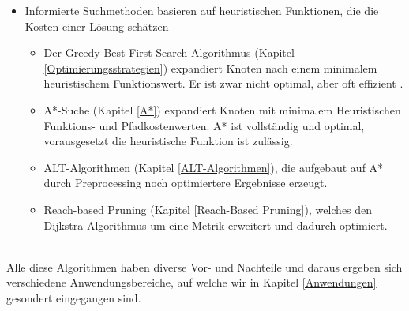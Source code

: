 \begin{itemize}
\begin{itemize}
    \end{itemize}
    \newpage
    \item Informierte Suchmethoden basieren auf heuristischen Funktionen, die die Kosten einer Lösung schätzen
    \begin{itemize}
        \item Der Greedy Best-First-Search-Algorithmus (Kapitel \ref{Optimierungsstrategien}) expandiert Knoten nach einem minimalem heuristischem Funktionswert. Er ist zwar nicht optimal, aber oft effizient \cite[108,109]{Russell:10}.
        \item A*-Suche (Kapitel \ref{A*}) expandiert Knoten mit minimalem Heuristischen Funktions- und Pfadkostenwerten. A* ist vollständig und optimal, vorausgesetzt die heuristische Funktion ist zulässig.
        \item ALT-Algorithmen (Kapitel \ref{ALT-Algorithmen}), die aufgebaut auf A* durch Preprocessing noch optimiertere Ergebnisse erzeugt.
        \item Reach-based Pruning (Kapitel \ref{Reach-Based Pruning}), welches den Dijkstra-Algorithmus um eine Metrik erweitert und dadurch optimiert.
    \end{itemize}
\end{itemize}
\noindent \\
Alle diese Algorithmen haben diverse Vor- und Nachteile und daraus ergeben sich verschiedene 
Anwendungsbereiche, auf welche wir in Kapitel \ref{Anwendungen} gesondert eingegangen sind.
